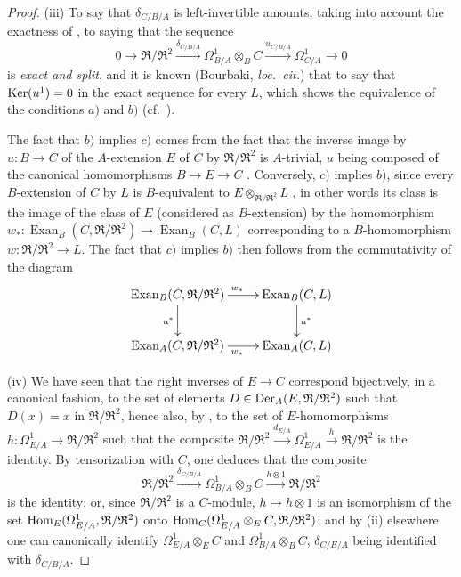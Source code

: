 \begin{proof}
\medskip
(iii) To say that $\delta_{C/B/A}$ is left-invertible amounts, taking into account the exactness of , to saying that the sequence
\begin{equation}
\tag{20.5.12.5}
  \label{0.20.5.12.5}
  0\to\mathfrak{R}/\mathfrak{R}^2\xrightarrow{\delta_{C/B/A}}\Omega^1_{B/A}\otimes_B C\xrightarrow{u_{C/B/A}}\Omega^1_{C/A}\to 0
\end{equation}
is \emph{exact and split}, and it is known (Bourbaki, \emph{loc.\ cit.}) that to say that $\operatorname{Ker}(u^1)=0$ in the exact sequence  for every $L$, which shows the equivalence of the conditions $a)$ and $b)$ (cf.\ ).

The fact that $b)$ implies $c)$ comes from the fact that the inverse image by $u:B\to C$ of the $A$-extension $E$ of $C$ by $\mathfrak{R}/\mathfrak{R}^2$ is $A$-trivial, $u$ being composed of the canonical homomorphisms $B\to E\to C$ .
Conversely, $c)$ implies $b)$, since every $B$-extension of $C$ by $L$ is $B$-equivalent to $E\otimes_{\mathfrak{R}/\mathfrak{R}^2}L$ , in other words its class is the image of the class of $E$ (considered as $B$-extension) by the homomorphism
$w_*:\operatorname{Exan}_B(C,\mathfrak{R}/\mathfrak{R}^2)\to\operatorname{Exan}_B(C,L)$ corresponding to a $B$-homomorphism $w:\mathfrak{R}/\mathfrak{R}^2\to L$.
The fact that $c)$ implies $b)$ then follows from the commutativity of the diagram 
\[
\xymatrix{
  \operatorname{Exan}_B(C,\mathfrak{R}/\mathfrak{R}^2) \ar[r]^{w_*} \ar[d]_{u^*} & \operatorname{Exan}_B(C,L) \ar[d]^{u^*} \\
  \operatorname{Exan}_A(C,\mathfrak{R}/\mathfrak{R}^2) \ar[r]_{w_*} & \operatorname{Exan}_A(C,L)
}
\]

\medskip
(iv) We have seen  that the right inverses of $E\to C$ correspond bijectively, in a canonical fashion, to the set of elements $D\in\operatorname{Der}_A(E,\mathfrak{R}/\mathfrak{R}^2)$ such that $D(x)=x$ in $\mathfrak{R}/\mathfrak{R}^2$, hence also, by , to the set of $E$-homomorphisms $h:\Omega^1_{E/A}\to\mathfrak{R}/\mathfrak{R}^2$ such that the composite $\mathfrak{R}/\mathfrak{R}^2\xrightarrow{d_{E/A}}\Omega^1_{E/A}\xrightarrow{h}\mathfrak{R}/\mathfrak{R}^2$ is the identity.
By tensorization with $C$, one deduces that the composite
\[
  \mathfrak{R}/\mathfrak{R}^2\xrightarrow{\delta_{C/B/A}}\Omega^1_{B/A}\otimes_B C\xrightarrow{h\otimes 1}\mathfrak{R}/\mathfrak{R}^2
\]
is the identity; or, since $\mathfrak{R}/\mathfrak{R}^2$ is a $C$-module, $h\mapsto h\otimes 1$ is an isomorphism of the set $\operatorname{Hom}_E(\Omega^1_{E/A},\mathfrak{R}/\mathfrak{R}^2)$ onto $\operatorname{Hom}_C(\Omega^1_{E/A}\otimes_E C,\mathfrak{R}/\mathfrak{R}^2)$; and by (ii) elsewhere one can canonically identify $\Omega^1_{E/A}\otimes_E C$ and $\Omega^1_{B/A}\otimes_B C$, $\delta_{C/E/A}$ being identified with $\delta_{C/B/A}$.
\end{proof}

